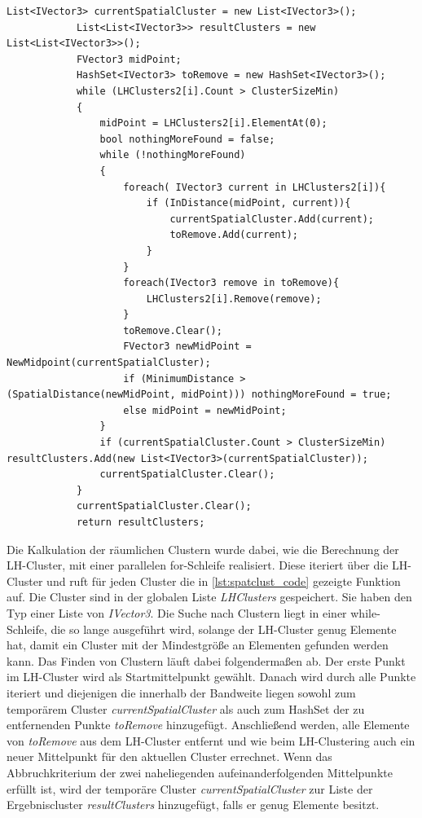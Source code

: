 \begin{lstlisting}[caption = Code zur Berechnung der räumlichen Cluster, label = lst:spatclust_code]
List<IVector3> currentSpatialCluster = new List<IVector3>();
            List<List<IVector3>> resultClusters = new List<List<IVector3>>();
            FVector3 midPoint;
            HashSet<IVector3> toRemove = new HashSet<IVector3>();
            while (LHClusters2[i].Count > ClusterSizeMin)
            {
                midPoint = LHClusters2[i].ElementAt(0);
                bool nothingMoreFound = false;
                while (!nothingMoreFound)
                {
                    foreach( IVector3 current in LHClusters2[i]){
                        if (InDistance(midPoint, current)){
                            currentSpatialCluster.Add(current);
                            toRemove.Add(current);
                        }
                    }
                    foreach(IVector3 remove in toRemove){
                        LHClusters2[i].Remove(remove);
                    }
                    toRemove.Clear();
                    FVector3 newMidPoint = NewMidpoint(currentSpatialCluster);
                    if (MinimumDistance > (SpatialDistance(newMidPoint, midPoint))) nothingMoreFound = true;
                    else midPoint = newMidPoint;
                }
                if (currentSpatialCluster.Count > ClusterSizeMin) resultClusters.Add(new List<IVector3>(currentSpatialCluster));
                currentSpatialCluster.Clear();
            }
            currentSpatialCluster.Clear();
            return resultClusters;

\end{lstlisting}


Die Kalkulation der räumlichen Clustern wurde dabei, wie die Berechnung der LH-Cluster, mit einer parallelen for-Schleife realisiert. Diese iteriert über die LH-Cluster und ruft für jeden Cluster die in \autoref{lst:spatclust_code} gezeigte Funktion auf. Die Cluster sind in der globalen Liste \textit{LHClusters} gespeichert. Sie haben den Typ einer Liste von \textit{IVector3}. 
\newline
Die Suche nach Clustern liegt in einer while-Schleife, die so lange ausgeführt wird, solange der LH-Cluster genug Elemente hat, damit ein Cluster mit der Mindestgröße an Elementen gefunden werden kann. 
\newline
Das Finden von Clustern läuft dabei folgendermaßen ab. Der erste Punkt im LH-Cluster wird als Startmittelpunkt gewählt. Danach wird durch alle Punkte iteriert und diejenigen die innerhalb der Bandweite liegen sowohl zum temporärem Cluster \textit{currentSpatialCluster} als auch zum HashSet der zu entfernenden Punkte \textit{toRemove} hinzugefügt.
\newline
Anschließend werden, alle Elemente von \textit{toRemove} aus dem LH-Cluster entfernt und wie beim LH-Clustering auch ein neuer Mittelpunkt für den aktuellen Cluster errechnet.
\newline
Wenn das Abbruchkriterium der zwei naheliegenden aufeinanderfolgenden Mittelpunkte erfüllt ist, wird der temporäre Cluster \textit{currentSpatialCluster} zur Liste der Ergebniscluster \textit{resultClusters} hinzugefügt, falls er genug Elemente besitzt.


